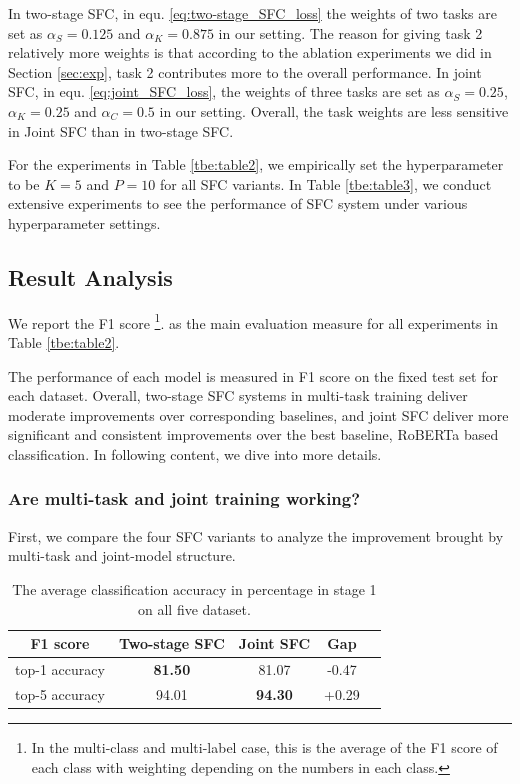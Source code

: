 In two-stage SFC, in equ. \ref{eq:two-stage_SFC_loss} the weights of two tasks
are  set  as  $\alpha_S=0.125$ and $\alpha_K=0.875$ in our setting. The reason
for  giving  task  2 relatively more weights is that according to the ablation
experiments  we  did  in Section \ref{sec:exp}, task 2 contributes more to the
overall  performance.  In  joint  SFC,  in  equ.  \ref{eq:joint_SFC_loss}, the
weights  of  three  tasks  are  set  as  $\alpha_S=0.25$,  $\alpha_K=0.25$ and
$\alpha_C=0.5$  in  our setting. Overall, the task weights are less sensitive
in Joint SFC than in two-stage SFC.

For  the  experiments  in  Table  \ref{tbe:table2},  we  empirically  set  the
hyperparameter  to  be  $K=5$  and  $P=10$  for  all  SFC  variants.  In Table
\ref{tbe:table3},  we  conduct extensive experiments to see the performance of
SFC system under various hyperparameter settings.

\subsection{Result Analysis}
We  report  the F1 score \footnote{In the multi-class and multi-label case, this
is  the  average  of  the F1 score of each class with weighting depending on the
numbers  in  each class.}. as the main evaluation measure for all experiments in
Table \ref{tbe:table2}.

The performance of each model is measured in F1 score on the fixed
test  set  for  each  dataset.  
Overall,  two-stage  SFC systems in multi-task training deliver  moderate 
improvements  over  corresponding baselines, and joint SFC deliver more
significant and consistent improvements over the best baseline, RoBERTa based
classification. In following content, we dive into more details.

\subsubsection*{Are multi-task and joint training working?} 
First, we compare the four  SFC  variants to analyze the improvement
brought  by  multi-task  and  joint-model  structure. 

\begin{table}
  \begin{centering}
    \begin{tabular}{|c|c|c|c|c|}
      \hline
      F1 score & Two-stage SFC & Joint SFC & Gap & \tabularnewline
      \hline
      top-1 accuracy  & \textbf{81.50} & 81.07 & -0.47 & \tabularnewline
      top-5 accuracy & 94.01 & \textbf{94.30} & +0.29 & \tabularnewline
      \hline
    \end{tabular}
    \par
  \end{centering}
  \caption{The average classification accuracy in percentage in stage 1 on all five dataset.}
  \label{tbe:top1_5_accuracy}
\end{table}

